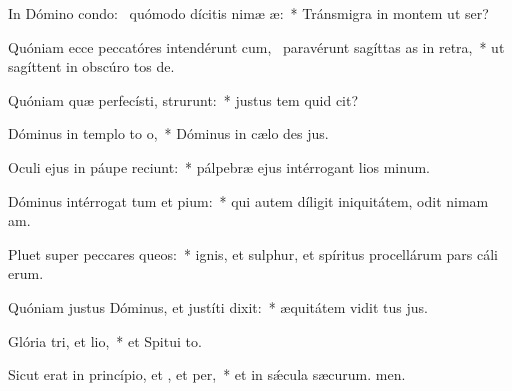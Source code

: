 \item In Dómino condo:~\pscross{} quómodo dícitis nimæ æ:~* Tránsmigra in montem ut ser?
\item Quóniam ecce peccatóres intendérunt cum,~\pscross{} paravérunt sagíttas as in retra,~* ut sagíttent in obscúro tos de.
\item Quóniam quæ perfecísti, strurunt:~* justus tem quid cit?
\item Dóminus in templo to o,~* Dóminus in cælo des jus.
\item Oculi ejus in páupe reciunt:~* pálpebræ ejus intérrogant lios minum.
\item Dóminus intérrogat tum et pium:~* qui autem díligit iniquitátem, odit nimam am.
\item Pluet super peccares queos:~* ignis, et sulphur, et spíritus procellárum pars cáli erum.
\item Quóniam justus Dóminus, et justíti dixit:~* æquitátem vidit tus jus.
\item Glória tri, et lio,~* et Spitui to.
\item Sicut erat in princípio, et , et per,~* et in sǽcula sæcurum. men.
